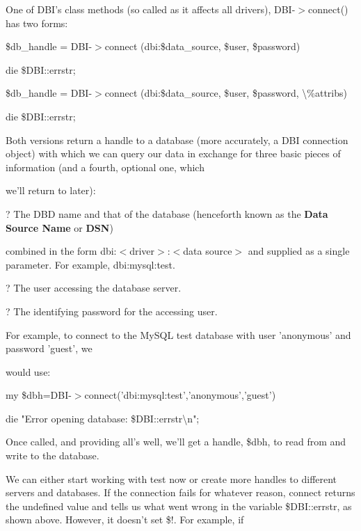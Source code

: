 \documentclass[a4paper,11pt]{book}
\begin{document}
\noindent 

\noindent One of DBI's class methods (so called as it affects all drivers), DBI-$>$connect() has two forms:

\noindent 

\noindent \$db\_handle = DBI-$>$connect (dbi:\$data\_source, \$user, \$password)

\noindent \textbar \textbar  die \$DBI::errstr;

\noindent \$db\_handle = DBI-$>$connect (dbi:\$data\_source, \$user, \$password, \textbackslash \%attribs)

\noindent \textbar \textbar  die \$DBI::errstr;

\noindent 

\noindent Both versions return a handle to a database (more accurately, a DBI connection object) with which we can query our data in exchange for three basic pieces of information (and a fourth, optional one, which

\noindent we'll return to later):

\noindent 

\noindent 

\noindent ? The DBD name and that of the database (henceforth known as the \textbf{Data Source Name }or \textbf{DSN})

\noindent combined in the form dbi:$<$driver$>$:$<$data source$>$ and supplied as a single parameter. For example, dbi:mysql:test.

\noindent 

\noindent ? The user accessing the database server.

\noindent 

\noindent ? The identifying password for the accessing user.

\noindent 

\noindent For example, to connect to the MySQL test database with user 'anonymous' and password 'guest', we

\noindent would use:

\noindent 

\noindent my \$dbh=DBI-$>$connect('dbi:mysql:test','anonymous','guest') \textbar \textbar 

\noindent die "Error opening database: \$DBI::errstr\textbackslash n";

\noindent 

\noindent Once called, and providing all's well, we'll get a handle, \$dbh, to read from and write to the database.

\noindent We can either start working with test now or create more handles to different servers and databases. If the connection fails for whatever reason, connect returns the undefined value and tells us what went wrong in the variable \$DBI::errstr, as shown above. However, it doesn't set \$!. For example, if
\end{document}
